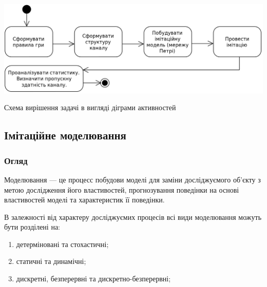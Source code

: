             \begin{stdfigure}
                \includegraphics[width=7in]{images/uml_act_solution_schema.png}
                \caption{Схема вирішення задачі в вигляді діграми активностей}
                \label{fig:solution_schema}
            \end{stdfigure}   

\subsection{Імітаційне моделювання}
\subsubsection{Огляд}
Моделювання --- це процесс побудови моделі для заміни досліджуємого об’єкту з метою дослідження його властивостей, прогнозування поведінки на основі властивостей моделі та характеристик її поведінки\cite{model}.

В залежності від характеру досліджуємих процесів всі види моделювання можуть бути розділені на:
\begin{enumerate}
\item детерміновані та стохастичні;
\item статичні та динамічні;
\item дискретні, безперервні та дискретно-безперервні;
\end{enumerate}

